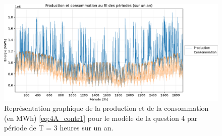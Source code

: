 \documentclass{article}
\begin{document}
\begin{figure}[h!]
    \centering
    \includegraphics[scale=0.6]{GraphesP2/Prod_Cons_Q4.pdf}
    \caption{Représentation graphique de la production et de la consommation (en MWh) \eqref{eq:4A_contr1} pour le modèle de la question 4 
    par période de T = 3 heures sur un an.}
    \label{fig:Prod_Cons_Q4}
\end{figure}



\clearpage
\end{document}
